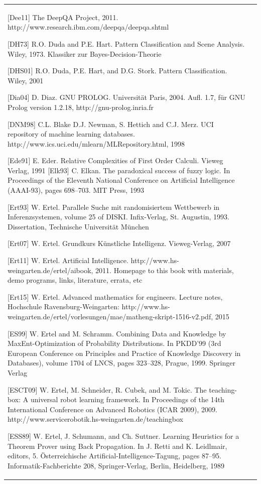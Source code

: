 \documentclass[10pt]{book}
\begin{document}
\begin{center}
\begin{tabular}{|l|l|}
[Dee11] The DeepQA Project, 2011. http://www.research.ibm.com/deepqa/deepqa.shtml

[DH73] R.O. Duda and P.E. Hart. Pattern Classification and Scene Analysis. Wiley, 1973. Klassiker zur Bayes-Decision-Theorie

[DHS01] R.O. Duda, P.E. Hart, and D.G. Stork. Pattern Classification. Wiley, 2001

[Dia04] D. Diaz. GNU PROLOG. Universität Paris, 2004. Aufl. 1.7, für GNU Prolog version 1.2.18, http://gnu-prolog.inria.fr

[DNM98] C.L. Blake D.J. Newman, S. Hettich and C.J. Merz. UCI repository of machine learning databases. http://www.ics.uci.edu/mlearn/MLRepository.html, 1998

[Ede91] E. Eder. Relative Complexities of First Order Calculi. Vieweg Verlag, 1991
[Elk93] C. Elkan. The paradoxical success of fuzzy logic. In Proceedings of the Eleventh National Conference on Artificial Intelligence (AAAI-93), pages 698–703. MIT Press, 1993

[Ert93] W. Ertel. Parallele Suche mit randomisiertem Wettbewerb in Inferenzsystemen, volume 25 of DISKI. Infix-Verlag, St. Augustin, 1993. Dissertation, Technische Universität München

[Ert07] W. Ertel. Grundkurs Künstliche Intelligenz. Vieweg-Verlag, 2007

[Ert11] W. Ertel. Artificial Intelligence. http://www.hs-weingarten.de/ertel/aibook, 2011. Homepage to this book with materials, demo programs, links, literature, errata, etc

[Ert15] W. Ertel. Advanced mathematics for engineers. Lecture notes, Hochschule Ravensburg-Weingarten: http://www.hs-weingarten.de/ertel/vorlesungen/mae/matheng-skript-1516-v2.pdf, 2015

[ES99] W. Ertel and M. Schramm. Combining Data and Knowledge by MaxEnt-Optimization of Probability Distributions. In PKDD'99 (3rd European Conference on Principles and Practice of Knowledge Discovery in Databases), volume 1704 of LNCS, pages 323–328, Prague, 1999. Springer Verlag

[ESCT09] W. Ertel, M. Schneider, R. Cubek, and M. Tokic. The teaching-box: A universal robot learning framework. In Proceedings of the 14th International Conference on Advanced Robotics (ICAR 2009), 2009. http://www.servicerobotik.hs-weingarten.de/teachingbox

[ESS89] W. Ertel, J. Schumann, and Ch. Suttner. Learning Heuristics for a Theorem Prover using Back Propagation. In J. Retti and K. Leidlmair, editors, 5. Österreichische Artificial-Intelligence-Tagung, pages 87–95. Informatik-Fachberichte 208, Springer-Verlag, Berlin, Heidelberg, 1989


\end{tabular}
\end{center}
\end{document}
